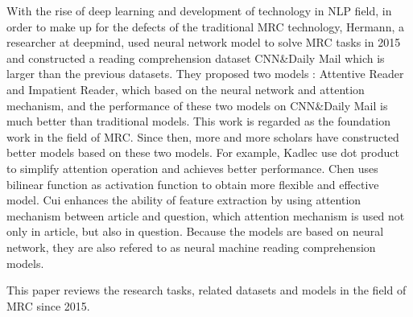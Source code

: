 With the rise of deep learning and development of technology in NLP field, in order to make up for the defects of 
the traditional MRC technology, Hermann, a researcher at deepmind, used neural network model to solve MRC tasks in 2015 and 
constructed a reading comprehension dataset CNN\&Daily Mail which is larger than the previous datasets.
They proposed two models : Attentive Reader and Impatient Reader, which based on the neural network and attention mechanism, 
and the performance of these two models on CNN\&Daily Mail is much better than traditional models.
This work is regarded as the foundation work in the field of MRC. Since then, more and more scholars 
have constructed better models based on these two models. 
For example, Kadlec use dot product to simplify attention operation and achieves better performance. Chen uses 
bilinear function as activation function to obtain more flexible and effective model. Cui enhances the ability of feature extraction by using 
attention mechanism between article and question, which attention mechanism is used not only in article, but also in question.
Because the models are based on neural network, they are also refered to as neural machine reading comprehension models.

This paper reviews the research tasks, related datasets and models in the field of MRC since 2015.